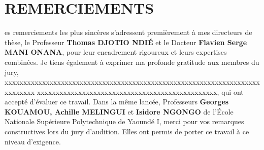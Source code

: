 
\chapter*{REMERCIEMENTS}
\thispagestyle{preliminaire}
\begin{sloppypar}
es remerciements les plus sinc\`eres s'adressent premi\`erement \`a mes directeurs de th\`ese, le Professeur \textbf{Thomas DJOTIO NDI\'E} et le Docteur \textbf{Flavien Serge MANI ONANA}, pour leur encadrement rigoureux et leurs expertises combin\'ees. Je tiens \'egalement \`a exprimer ma profonde gratitude aux membres du jury, xxxxxxxxxxxxxxxxxxxxxxxxxxxxxxxxxxxxxxxxxxxxxxxxxxxxxxxxxxxxxxxxxxxxxxxxxxxx xxxxxxxxxxxxxxxxxxxxxxxxxxxxxxxxxxxxxxxxxxxxxxxx, qui ont accept\'e d'\'evaluer ce travail. Dans la même lanc\'ee, Professeurs \textbf{Georges KOUAMOU, Achille MELINGUI} et \textbf{Isidore NGONGO} de
l'\'Ecole Nationale Supérieure Polytechnique de Yaoundé I, merci pour vos remarques constructives lors du jury d'audition. Elles ont permis de porter ce travail \`a ce niveau d'exigence.
\end{sloppypar}
\vspace{0.5cm}

